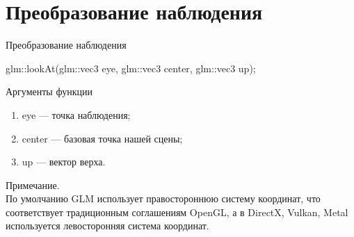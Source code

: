 \documentclass{beamer}
\begin{document}
	\section{Преобразование наблюдения}
	\begin{frame}{Преобразование наблюдения}
		
		glm::lookAt(glm::vec3 eye, glm::vec3 center, glm::vec3 up);

		Аргументы функции
		\begin{enumerate}
			\item eye --- точка наблюдения;
			\item center --- базовая точка нашей сцены;
			\item up --- вектор верха.
		\end{enumerate}


		\vspace{0.5cm}
		Примечание.\\
		По умолчанию GLM использует правостороннюю систему координат, что соответствует традиционным соглашениям OpenGL, а в DirectX, Vulkan, Metal используется левосторонняя система координат.
		
	\end{frame}

	
\end{document}

